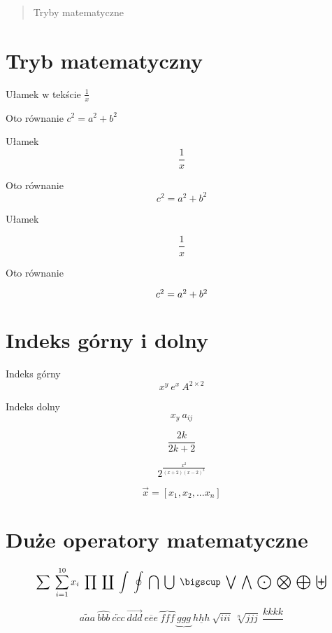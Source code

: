 \documentclass[a4paper,12pt]{article}
\title{}
\author{}
\begin{document}
\maketitle

\begin{abstract}
Tryby matematyczne 
\end{abstract}

\section{Tryb matematyczny}

Ułamek w tekście $ \frac{1}{x} $ 

Oto równanie $c^{2}=a^{2}+b^{2}$

Ułamek $$ \frac{1}{x} $$

Oto równanie $$c^{2}=a^{2}+b^{2}$$


Ułamek 

\begin{equation}
\frac{1}{x}
\label{eq:rownanie1}
\end{equation}

Oto równanie

\begin{equation}
$$c^{2}=a^{2}+b^{2}$$
\label{eq:rownanie2}
\end{equation}

\section{Indeks górny i dolny}

Indeks górny $$x^{y}  \  e^{x} \ A^{2 \times 2}$$

Indeks dolny$$ x_y \ a_{ij} $$

$$ \frac{2{k}}{2{k+2}} $$

$$ 2^\frac{x^{2}}{(x+2)(x-2)^{3}} $$

$$ \vec{x}=[x_1,x_2,...x_n]$$

\section{Duże operatory matematyczne}

$$\sum \ \sum_{i=1}^{10}x_{i} \ \prod \ \coprod \ \int \ \oint \ \bigcap \ \bigcup\ \bigscup \ \bigvee \ \bigwedge \ \bigodot \ \bigotimes \ \bigoplus \ \biguplus$$


$$\widetilde{aaa} \ \widehat{bbb} \ \overleftarrow{ccc} \ \overrightarrow{ddd} \ \overline{eee} \ \overbrace{fff} \ \underbrace{ggg} \ \underline{hhh} \ \sqrt{iii} \ \sqrt[n]{jjj} \ \frac{kkkk}{}$$
\end{document}
